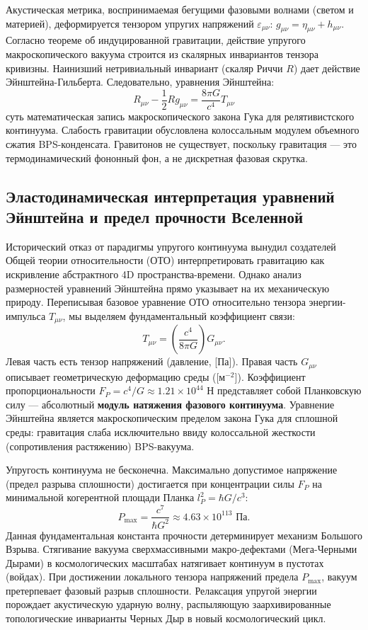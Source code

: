 \documentclass[11pt,a4paper]{article}
\begin{document}
Акустическая метрика, воспринимаемая бегущими фазовыми волнами (светом и материей), деформируется тензором упругих напряжений $\varepsilon_{\mu\nu}$: $g_{\mu\nu} = \eta_{\mu\nu} + h_{\mu\nu}$. Согласно теореме об индуцированной гравитации, действие упругого макроскопического вакуума строится из скалярных инвариантов тензора кривизны. Наинизший нетривиальный инвариант (скаляр Риччи $R$) дает действие Эйнштейна-Гильберта. Следовательно, уравнения Эйнштейна:
\begin{equation}
R_{\mu\nu} - \frac{1}{2}R g_{\mu\nu} = \frac{8\pi G}{c^4} T_{\mu\nu}
\end{equation}
суть математическая запись макроскопического закона Гука для релятивистского континуума. Слабость гравитации обусловлена колоссальным модулем объемного сжатия BPS-конденсата. Гравитонов не существует, поскольку гравитация — это термодинамический фононный фон, а не дискретная фазовая скрутка.

\subsection{Эластодинамическая интерпретация уравнений Эйнштейна и предел прочности Вселенной}
Исторический отказ от парадигмы упругого континуума вынудил создателей Общей теории относительности (ОТО) интерпретировать гравитацию как искривление абстрактного 4D пространства-времени. Однако анализ размерностей уравнений Эйнштейна прямо указывает на их механическую природу.
Переписывая базовое уравнение ОТО относительно тензора энергии-импульса $T_{\mu\nu}$, мы выделяем фундаментальный коэффициент связи:
\begin{equation}
	T_{\mu\nu} = \left( \frac{c^4}{8\pi G} \right) G_{\mu\nu}.
\end{equation}
Левая часть есть тензор напряжений (давление, [Па]). Правая часть $G_{\mu\nu}$ описывает геометрическую деформацию среды ([м$^{-2}$]). Коэффициент пропорциональности $F_P = c^4/G \approx 1.21 \times 10^{44}$ Н представляет собой Планковскую силу — абсолютный \textbf{модуль натяжения фазового континуума}. Уравнение Эйнштейна является макроскопическим пределом закона Гука для сплошной среды: гравитация слаба исключительно ввиду колоссальной жесткости (сопротивления растяжению) BPS-вакуума.

Упругость континуума не бесконечна. Максимально допустимое напряжение (предел разрыва сплошности) достигается при концентрации силы $F_P$ на минимальной когерентной площади Планка $l_P^2 = \hbar G/c^3$:
\begin{equation}
	P_{\text{max}} = \frac{c^7}{\hbar G^2} \approx 4.63 \times 10^{113} \text{ Па}.
\end{equation}
Данная фундаментальная константа прочности детерминирует механизм Большого Взрыва. Стягивание вакуума сверхмассивными макро-дефектами (Мега-Черными Дырами) в космологических масштабах натягивает континуум в пустотах (войдах). При достижении локального тензора напряжений предела $P_{\text{max}}$, вакуум претерпевает фазовый разрыв сплошности. Релаксация упругой энергии порождает акустическую ударную волну, распыляющую заархивированные топологические инварианты Черных Дыр в новый космологический цикл.
\end{document}
